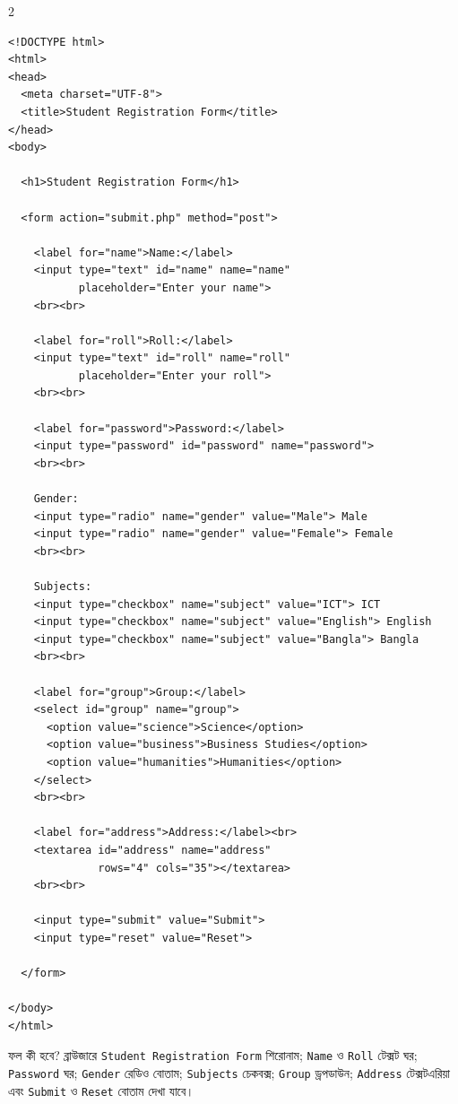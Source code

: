 \par{}\par
\begin{multicols}{2}
\begin{verbatim}
<!DOCTYPE html>
<html>
<head>
  <meta charset="UTF-8">
  <title>Student Registration Form</title>
</head>
<body>

  <h1>Student Registration Form</h1>

  <form action="submit.php" method="post">

    <label for="name">Name:</label>
    <input type="text" id="name" name="name"
           placeholder="Enter your name">
    <br><br>

    <label for="roll">Roll:</label>
    <input type="text" id="roll" name="roll"
           placeholder="Enter your roll">
    <br><br>

    <label for="password">Password:</label>
    <input type="password" id="password" name="password">
    <br><br>

    Gender:
    <input type="radio" name="gender" value="Male"> Male
    <input type="radio" name="gender" value="Female"> Female
    <br><br>

    Subjects:
    <input type="checkbox" name="subject" value="ICT"> ICT
    <input type="checkbox" name="subject" value="English"> English
    <input type="checkbox" name="subject" value="Bangla"> Bangla
    <br><br>

    <label for="group">Group:</label>
    <select id="group" name="group">
      <option value="science">Science</option>
      <option value="business">Business Studies</option>
      <option value="humanities">Humanities</option>
    </select>
    <br><br>

    <label for="address">Address:</label><br>
    <textarea id="address" name="address"
              rows="4" cols="35"></textarea>
    <br><br>

    <input type="submit" value="Submit">
    <input type="reset" value="Reset">

  </form>

</body>
</html>
\end{verbatim}
\end{multicols}


\begin{examplebox}{ফল কী হবে?}
ব্রাউজারে \texttt{Student Registration Form} শিরোনাম; \texttt{Name} ও \texttt{Roll} টেক্সট ঘর; \texttt{Password} ঘর; \texttt{Gender} রেডিও বোতাম; \texttt{Subjects} চেকবক্স; \texttt{Group} ড্রপডাউন; \texttt{Address} টেক্সটএরিয়া এবং \texttt{Submit} ও \texttt{Reset} বোতাম দেখা যাবে।
\end{examplebox}

